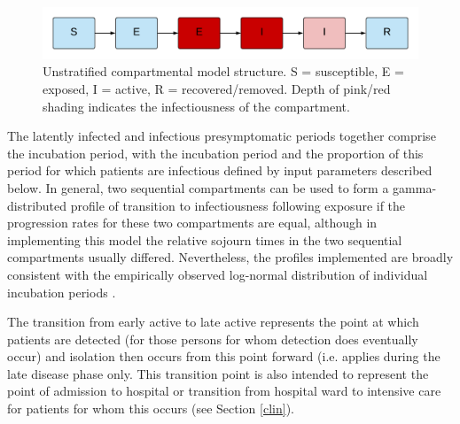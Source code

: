 \begin{figure}[ht]
    \includegraphics[width=\textwidth]{../covid_19/covid_19_seeiir.pdf}
    \caption{Unstratified compartmental model structure. S = susceptible, E = exposed, I = active, R = recovered/removed. Depth of pink/red shading indicates the infectiousness of the compartment.}
    \label{fig:seeiir}
\end{figure}

The latently infected and infectious presymptomatic periods together comprise the incubation period, with the incubation period and the proportion of this period for which patients are infectious defined by input parameters described below. In general, two sequential compartments can be used to form a gamma-distributed profile of transition to infectiousness following exposure if the progression rates for these two compartments are equal, although in implementing this model the relative sojourn times in the two sequential compartments usually differed. Nevertheless, the profiles implemented are broadly consistent with the empirically observed log-normal distribution of individual incubation periods \cite{RN13}.

The transition from early active to late active represents the point at which patients are detected (for those persons for whom detection does eventually occur) and isolation then occurs from this point forward (i.e. applies during the late disease phase only. This transition point is also intended to represent the point of admission to hospital or transition from hospital ward to intensive care for patients for whom this occurs (see Section \ref{clin}).
